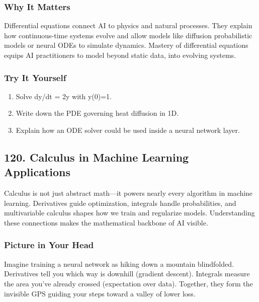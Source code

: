 \documentclass[
  letterpaper,
  DIV=11,
  numbers=noendperiod]{scrreprt}
\providecommand{\tightlist}{%
  \setlength{\itemsep}{0pt}\setlength{\parskip}{0pt}}
\begin{document}
\subsubsection{Why It Matters}\label{why-it-matters-16}

Differential equations connect AI to physics and natural processes. They
explain how continuous-time systems evolve and allow models like
diffusion probabilistic models or neural ODEs to simulate dynamics.
Mastery of differential equations equips AI practitioners to model
beyond static data, into evolving systems.

\subsubsection{Try It Yourself}\label{try-it-yourself-118}

\begin{enumerate}
\def\labelenumi{\arabic{enumi}.}
\tightlist
\item
  Solve dy/dt = 2y with y(0)=1.
\item
  Write down the PDE governing heat diffusion in 1D.
\item
  Explain how an ODE solver could be used inside a neural network layer.
\end{enumerate}

\subsection{120. Calculus in Machine Learning
Applications}\label{calculus-in-machine-learning-applications}

Calculus is not just abstract math---it powers nearly every algorithm in
machine learning. Derivatives guide optimization, integrals handle
probabilities, and multivariable calculus shapes how we train and
regularize models. Understanding these connections makes the
mathematical backbone of AI visible.

\subsubsection{Picture in Your Head}\label{picture-in-your-head-119}

Imagine training a neural network as hiking down a mountain blindfolded.
Derivatives tell you which way is downhill (gradient descent). Integrals
measure the area you've already crossed (expectation over data).
Together, they form the invisible GPS guiding your steps toward a valley
of lower loss.
\end{document}
